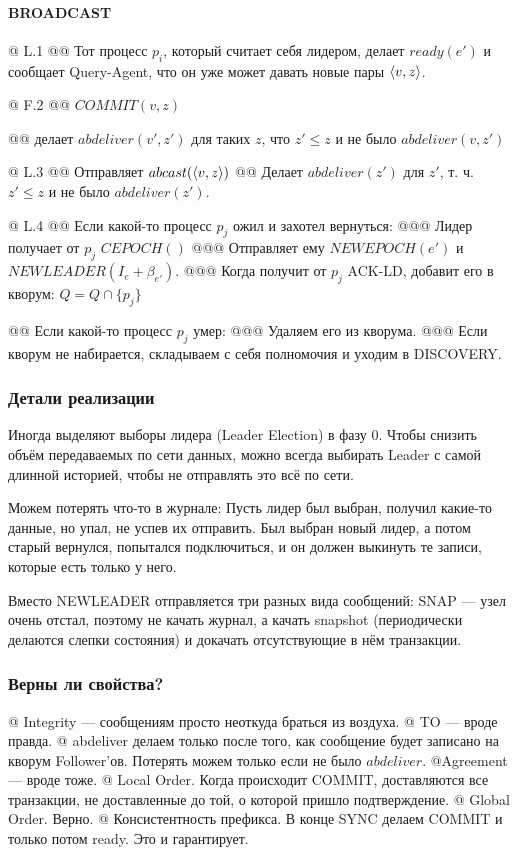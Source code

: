 \paragraph{BROADCAST}
\begin{el}[ul]
@ L.1 
@@ Тот процесс $p_i$, который считает себя лидером, делает $ready(e')$ и сообщает Query-Agent, что он уже может давать новые пары $\langle v, z\rangle$.

@ F.2
@@ $COMMIT(v, z)$

@@ делает $abdeliver(v', z')$ для таких $z$, что $z' \le z$ и не было $abdeliver(v, z')$

@ L.3
@@ Отправляет $abcast(\langle v, z\rangle)$
@@ Делает $abdeliver(z')$ для $z'$, т. ч. $z' \le z$ и не было $abdeliver(z')$.

@ L.4 
@@ Если какой-то процесс $p_j$ ожил и захотел вернуться:
@@@ Лидер получает от $p_j$ $CEPOCH()$
@@@ Отправляет ему $NEWEPOCH(e')$ и $NEWLEADER(I_e + \beta_{e'})$.
@@@ Когда получит от $p_j$ ACK-LD, добавит его в кворум: $Q = Q \cap \{p_j\}$

@@ Если какой-то процесс $p_j$ умер:
@@@ Удаляем его из кворума.
@@@ Если кворум не набирается, складываем с себя полномочия и уходим в DISCOVERY.
\end{el}

\subsubsection{Детали реализации}
Иногда выделяют выборы лидера (Leader Election) в фазу 0.
Чтобы снизить объём передаваемых по сети данных, можно всегда выбирать Leader с самой длинной историей, чтобы не отправлять это всё по сети.

Можем потерять что-то в журнале: 
Пусть лидер был выбран, получил какие-то данные, но упал, не успев их отправить. Был выбран новый лидер, а потом старый вернулся, попытался подключиться, и он должен выкинуть те записи, которые есть только у него.

Вместо NEWLEADER отправляется три разных вида сообщений:
SNAP --- узел очень отстал, поэтому не качать журнал, а качать snapshot (периодически делаются слепки состояния) и докачать отсутствующие в нём транзакции.

\subsubsection{Верны ли свойства?}
\begin{el}[ul]
@ Integrity --- сообщениям просто неоткуда браться из воздуха.
@ TO --- вроде правда.
@ abdeliver делаем только после того, как сообщение будет записано на кворум Follower'ов. Потерять можем только если не было $abdeliver$.
@Agreement --- вроде тоже.
@ Local Order. Когда происходит COMMIT, доставляются все транзакции, не доставленные до той, о которой пришло подтверждение.
@ Global Order. Верно.
@ Консистентность префикса.
В конце SYNC делаем COMMIT и только потом ready. Это и гарантирует. 
\end{el}

